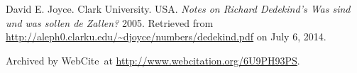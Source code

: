 \begin{thebibliography}{9}

David E. Joyce. Clark University. USA. \emph{Notes on Richard Dedekind's Was
sind und was sollen de Zallen?} 2005. Retrieved from
\url{http://aleph0.clarku.edu/~djoyce/numbers/dedekind.pdf} on July 6, 2014.

Archived by WebCite\textsuperscript{\textregistered}\ at
\url{http://www.webcitation.org/6U9PH93PS}.

\backrefprint






\end{thebibliography}
